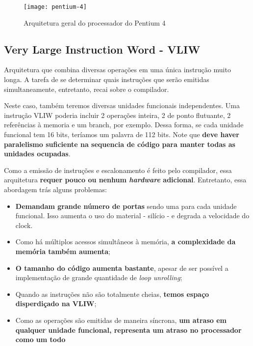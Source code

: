 \begin{figure}[ht]
  \centering
  \texttt{[image: pentium-4]}
  \caption{Arquitetura geral do processador do Pentium 4  }
  \label{fig:pentium4}
\end{figure}


\subsection{Very Large Instruction Word - VLIW}
\begin{definicao}{}
  Arquitetura que combina diversas operações em uma única instrução muito longa. A tarefa de se determinar quais instruções que serão emitidas simultaneamente, entretanto, recai sobre o compilador.
\end{definicao}

Neste caso, também teremos diversas unidades funcionais independentes. Uma instrução VLIW poderia incluir 2 operações inteira, 2 de ponto flutuante, 2 referências à memoria e um branch, por exemplo. Dessa forma, se cada unidade funcional tem 16 bits, teríamos um palavra de 112 bits. Note que \textbf{deve haver paralelismo suficiente na sequencia de código para manter todas as unidades ocupadas}.

Como a emissão de instruções e escalonamento é feito pelo compilador, essa arquitetura \textbf{requer pouco ou nenhum \textit{hardware} adicional}. Entretanto, essa abordagem trás alguns problemas:
\begin{itemize}
  \item \textbf{Demandam grande número de portas} sendo uma para cada unidade funcional. Isso aumenta o uso do material - silício - e degrada a velocidade do clock.

  \item Como há múltiplos acessos simultâneos à memória, \textbf{a complexidade da memória também aumenta};

  \item \textbf{O tamanho do código aumenta bastante}, apesar de ser possível a implementação de grande quantidade de \textit{loop unrolling};

  \item Quando as instruções não são totalmente cheias, \textbf{temos espaço disperdiçado na VLIW};

  \item Como as operações são emitidas de maneira síncrona, \textbf{um atraso em qualquer unidade funcional, representa um atraso no processador como um todo}
\end{itemize}

